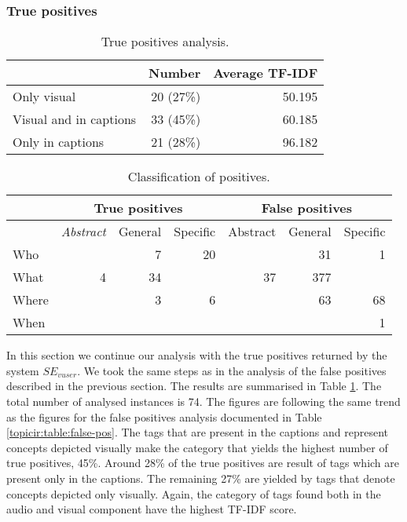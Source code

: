 \subsubsection{True positives}

\begin{table}[tb]
\centering
\begin{footnotesize}
\begin{tabular}{l|r|r}
\toprule
 & Number & Average TF-IDF\\
 \hline
Only visual & 20 (27\%)& 50.195\\
\hline
Visual and in captions& 33 (45\%)& 60.185\\
\hline
Only in captions  & 21 (28\%)& 96.182\\
\bottomrule
\end{tabular}
\caption{True positives analysis.}
\label{topicir:table:true-pos}
\end{footnotesize}
\end{table}

\begin{table}
\centering
\begin{footnotesize}
\begin{tabular}{l|r|r|r|r|r|r}
\toprule
 & \multicolumn{3}{|c|}{\textbf{True positives}} & \multicolumn{3}{c}{\textbf{False positives}}\\
 \hline
  & \textit{Abstract} & General & Specific & Abstract & General & Specific\\
\hline
Who & & 7& 20& &31 &1\\
\hline
What &4 &34 & &37 & 377&\\
\hline
Where & & 3&6 & &63 &68\\
\hline
When & & & & & &1\\
\bottomrule
\end{tabular}
\caption{Classification of positives.}
\label{topicir:table:pan-shat}
\end{footnotesize}
\end{table}

In this section we continue our analysis with the true positives returned by the system $SE_{vuser}$. We took the same steps as in the analysis of the false positives described in the previous section. The results are summarised in Table \ref{topicir:table:true-pos}. The total number of analysed instances is 74. The figures are following the same trend as the figures for the false positives analysis documented in Table \ref{topicir:table:false-pos}. The tags that are present in the captions and represent concepts depicted visually make the category that yields the highest number of true positives, 45\%. Around 28\% of the true positives are result of tags which are present only in the captions. The remaining 27\% are yielded by tags that denote concepts depicted only visually. Again, the category of tags found both in the audio and visual component have the highest TF-IDF score.


